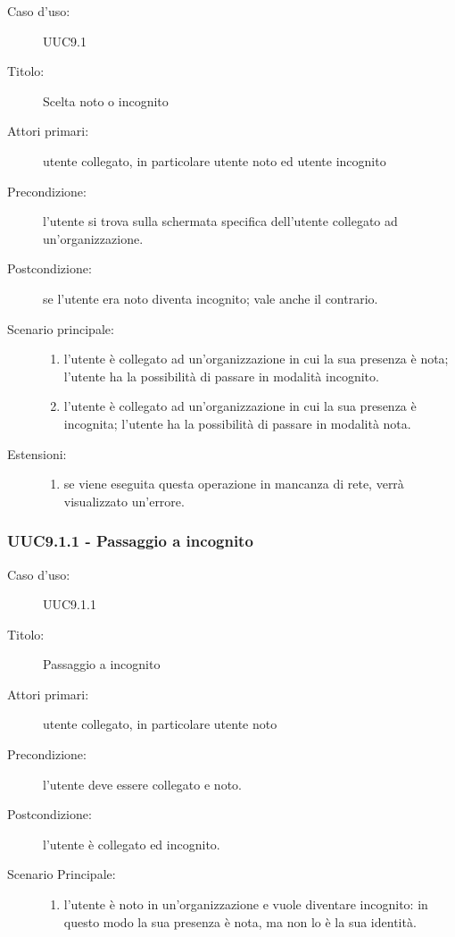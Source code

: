 \documentclass[casi-duso]{subfiles}
\begin{document}
\begin{description}
  \item[Caso d’uso:] UUC9.1
  \item[Titolo:] Scelta noto o incognito
  \item[Attori primari:] utente collegato, in particolare utente noto ed utente incognito
  \item[Precondizione:] l'utente si trova sulla schermata specifica dell'utente collegato ad un'organizzazione.
  \item[Postcondizione:] se l'utente era noto diventa incognito; vale anche il contrario.
  \item[Scenario principale:]
        \begin{enumerate}
          \item l'utente è collegato ad un'organizzazione in cui la sua presenza è nota; l'utente ha la possibilità di passare in modalità incognito.
          \item l'utente è collegato ad un'organizzazione in cui la sua presenza è incognita; l'utente ha la possibilità di passare in modalità nota.
        \end{enumerate}
  \item[Estensioni:]
        \begin{enumerate}
          \item se viene eseguita questa operazione in mancanza di rete, verrà visualizzato un'errore.
        \end{enumerate}
\end{description}

\subsubsection{UUC9.1.1 - Passaggio a incognito}%
\label{subsub:UUC9.1.1utente}
\begin{description}
  \item[Caso d’uso:] UUC9.1.1
  \item[Titolo:] Passaggio a incognito
  \item[Attori primari:] utente collegato, in particolare utente noto
  \item[Precondizione:] l'utente deve essere collegato e noto.
  \item[Postcondizione:] l'utente è collegato ed incognito.
  \item[Scenario Principale:]
        \begin{enumerate}
          \item l'utente è noto in un'organizzazione e vuole diventare incognito: in questo modo la sua presenza è nota, ma non lo è la sua identità.
        \end{enumerate}
\end{description}
\end{document}
